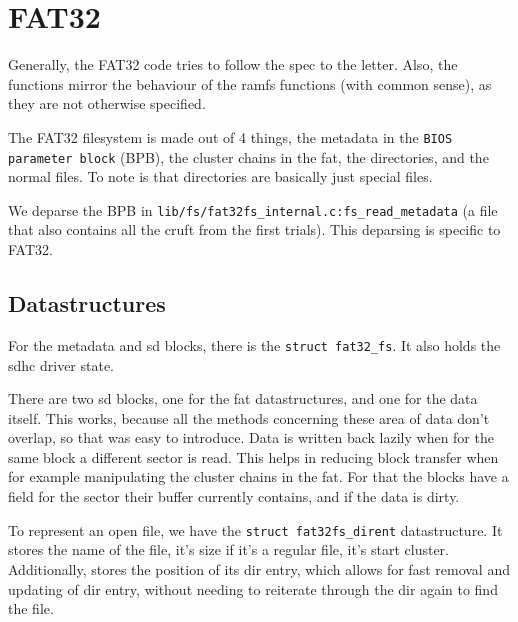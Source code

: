 \section{FAT32}

Generally, the FAT32 code tries to follow the spec to the letter.
Also, the functions mirror the behaviour of the ramfs functions (with common
sense), as they are not otherwise specified.

The FAT32 filesystem is made out of 4 things, the metadata in the
\verb|BIOS parameter block| (BPB), the cluster chains in the fat, the
directories, and the normal files.
To note is that directories are basically just special files.

We deparse the BPB in \verb|lib/fs/fat32fs_internal.c:fs_read_metadata|
(a file that also contains all the cruft from the first trials).
This deparsing is specific to FAT32.

\subsection{Datastructures}

For the metadata and sd blocks, there is the \verb|struct fat32_fs|.
It also holds the sdhc driver state.

There are two sd blocks, one for the fat datastructures, and one for the data
itself.
This works, because all the methods concerning these area of data don't overlap,
so that was easy to introduce.
Data is written back lazily when for the same block a different sector is read.
This helps in reducing block transfer when for example manipulating the cluster
chains in the fat.
For that the blocks have a field for the sector their buffer currently contains,
and if the data is dirty.

To represent an open file, we have the \verb|struct fat32fs_dirent|
datastructure.
It stores the name of the file, it's size if it's a regular file, it's start
cluster.
Additionally, stores the position of its dir entry, which allows for fast
removal and updating of dir entry, without needing to reiterate through the dir
again to find the file.

